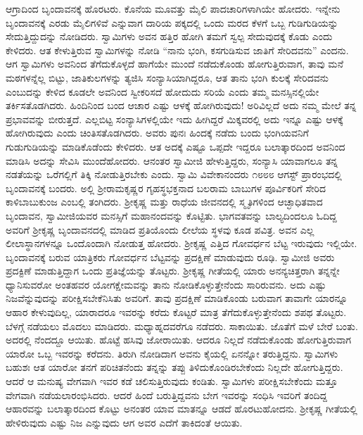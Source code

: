  ಆಗ್ರಾದಿಂದ ಬೃಂದಾವನಕ್ಕೆ ಹೊರಟರು. ಕೊನೆಯ ಮೂವತ್ತು ಮೈಲಿ ಪಾದಚಾರಿಗಳಾಗಿಯೇ ಹೋದರು. ಇನ್ನೇನು ಬೃಂದಾವನಕ್ಕೆ ಎರಡು ಮೈಲಿಗಳಿವೆ ಎನ್ನುವಾಗ ದಾರಿಯ ಪಕ್ಕದಲ್ಲಿ ಒಂದು ಮರದ ಕೆಳಗೆ ಒಬ್ಬ ಗುಡಿಗುಡಿಯನ್ನು ಸೇದುತ್ತಿದ್ದುದನ್ನು ನೋಡಿದರು. ಸ್ವಾಮಿಗಳು ಅವನ ಹತ್ತಿರ ಹೋಗಿ ತಮಗೆ ಸ್ವಲ್ಪ ಸೇದುವುದಕ್ಕೆ ಕೊಡು ಎಂದು ಕೇಳಿದರು. ಆತ ಕೇಳುತ್ತಿರುವ ಸ್ವಾಮಿಗಳನ್ನು ನೋಡಿ “ನಾನು ಭಂಗಿ, ಕಸಗುಡಿಸುವ ಜಾತಿಗೆ ಸೇರಿದವನು” ಎಂದನು. ಆಗ ಸ್ವಾಮಿಗಳು ಅವನಿಂದ ತೆಗೆದುಕೊಳ್ಳದೆ ಹಾಗೆಯೇ ಮುಂದೆ ನಡೆದುಕೊಂಡು ಹೋಗುತ್ತಿರುವಾಗ, ತಾವು ಮನೆ ಮಠಗಳನ್ನೆಲ್ಲ ಬಿಟ್ಟು, ಜಾತಿಕುಲಗಳನ್ನು ತ್ಯಜಿಸಿ ಸಂನ್ಯಾಸಿಯಾಗಿದ್ದರೂ, ಆತ ತಾನು ಭಂಗಿ ಕುಲಕ್ಕೆ ಸೇರಿದವನು ಎಂಬುದನ್ನು ಕೇಳಿದ ಕೂಡಲೇ ಅವನಿಂದ ಸ್ವೀಕರಿಸದೆ ಹೋದುದು ಸರಿಯೆ ಎಂದು ತಮ್ಮ ಮನಸ್ಸಿನಲ್ಲಿಯೇ ತರ್ಕಿಸತೊಡಗಿದರು. ಹಿಂದಿನಿಂದ ಬಂದ ಆಚಾರ ಎಷ್ಟು ಆಳಕ್ಕೆ ಹೋಗಿರುವುದು! ಅರಿವಿಲ್ಲದೆ ಅದು ನಮ್ಮ ಮೇಲೆ ತನ್ನ ಪ್ರಭಾವವನ್ನು ಬೀರುತ್ತದೆ. ಎಲ್ಲಬಿಟ್ಟ ಸಂನ್ಯಾಸಿಗಳಲ್ಲಿಯೇ ಇದು ಹೀಗಿದ್ದರೆ ಮಿಕ್ಕವರಲ್ಲಿ ಅದು ಇನ್ನೂ ಎಷ್ಟು ಆಳಕ್ಕೆ ಹೋಗಿರುವುದು ಎಂದು ಚಿಂತಿಸತೊಡಗಿದರು. ಅವರು ಪುನಃ ಹಿಂದಕ್ಕೆ ನಡೆದು ಬಂದು ಭಂಗಿಯವನಿಗೆ ಗುಡುಗುಡಿಯನ್ನು ಮಾಡಿಕೊಡೆಂದು ಕೇಳಿದರು. ಆತ ಅದಕ್ಕೆ ಎಷ್ಟೂ ಒಪ್ಪದೇ ಇದ್ದರೂ ಬಲಾತ್ಕಾರದಿಂದ ಅವನಿಂದ ಮಾಡಿಸಿ ಅದನ್ನು ಸೇವಿಸಿ ಮುಂದೆಹೋದರು. ಆನಂತರ ಸ್ವಾಮೀಜಿ ಹೇಳುತ್ತಿದ್ದರು, ಸಂನ್ಯಾಸಿ ಯಾವಾಗಲೂ ತನ್ನ ನಡತೆಯನ್ನು ಒರೆಗಲ್ಲಿಗೆ ತಿಕ್ಕಿ ನೋಡುತ್ತಿರಬೇಕು ಎಂದು. ಸ್ವಾಮಿ ವಿವೇಕಾನಂದರು ೧೮೮೮ ಆಗಸ್ಟ್ ಪ್ರಾರಂಭದಲ್ಲಿ ಬೃಂದಾವನಕ್ಕೆ ಬಂದರು. ಅಲ್ಲಿ ಶ‍್ರೀರಾಮಕೃಷ್ಣರ ಗೃಹಸ್ಥಭಕ್ತನಾದ ಬಲರಾಮ ಬಾಬುಗಳ ಪೂರ್ವಿಕರಿಗೆ ಸೇರಿದ ಕಾಳಿಬಾಬುಕುಂಜ ಎಂಬಲ್ಲಿ ತಂಗಿದರು. ಶ‍್ರೀಕೃಷ್ಣ ಮತ್ತು ರಾಧೆಯ ಜೀವನದಲ್ಲಿ ಸ್ಮೃತಿಗಳಿಂದ ಆಚ್ಛಾಧಿತವಾದ ಬೃಂದಾವನ, ಸ್ವಾಮೀಜಿಯವರ ಮನಸ್ಸಿಗೆ ಮಹಾನಂದವನ್ನು ಕೊಟ್ಟಿತು. ಭಾಗವತವನ್ನು ಬಾಲ್ಯದಿಂದಲೂ ಓದಿದ್ದ ಅವರಿಗೆ ಶ‍್ರೀಕೃಷ್ಣ ಬೃಂದಾವನದಲ್ಲಿ ಮಾಡಿದ ಪ್ರತಿಯೊಂದು ಲೀಲೆಯ ಸ್ಥಳವು ಕೂಡ ಪವಿತ್ರ. ಅವನ ಎಲ್ಲ ಲೀಲಾಸ್ಥಾನಗಳನ್ನೂ ಒಂದೊಂದಾಗಿ ನೋಡುತ್ತ ಹೋದರು. ಶ‍್ರೀಕೃಷ್ಣ ಎತ್ತಿದ ಗೋವರ್ಧನ ಬೆಟ್ಟ ಇರುವುದು ಇಲ್ಲಿಯೇ. ಬೃಂದಾವನಕ್ಕೆ ಬರುವ ಯಾತ್ರಿಕರು ಗೋವರ್ಧನ ಬೆಟ್ಟವನ್ನು ಪ್ರದಕ್ಷಿಣೆ ಮಾಡುವುದು ರೂಢಿ. ಸ್ವಾಮೀಜಿ ಅವರು ಪ್ರದಕ್ಟಿಣೆ ಮಾಡುತ್ತಿದ್ದಾಗ ಒಂದು ಪ್ರತಿಜ್ಞೆಯನ್ನು ತೊಟ್ಟರು. ಶ‍್ರೀಕೃಷ್ಣ ಗೀತೆಯಲ್ಲಿ ಯಾರು ಅನನ್ಯಚಿತ್ತರಾಗಿ ತನ್ನನ್ನೇ ಧ್ಯಾನಿಸುವರೋ ಅಂತಹವರ ಯೋಗಕ್ಷೇಮವನ್ನು ತಾನು ನೋಡಿಕೊಳ್ಳುತ್ತೇನೆಂದು ಸಾರಿರುವನು. ಅದು ಎಷ್ಟು ನಿಜವೆನ್ನುವುದನ್ನು ಪರೀಕ್ಷಿಸಬೇಕೆನಿಸಿತು ಅವರಿಗೆ. ತಾವು ಪ್ರದಕ್ಷಿಣೆ ಮಾಡಿಕೊಂಡು ಬರುವಾಗ ತಾವಾಗೇ ಯಾರನ್ನೂ ಆಹಾರ ಕೇಳುವುದಿಲ್ಲ, ಯಾರಾದರೂ ಇವರನ್ನು ಕರೆದು ಕೊಟ್ಟರೆ ಮಾತ್ರ ತೆಗೆದುಕೊಳ್ಳುತ್ತೇನೆಂದು ಶಪಥ ತೊಟ್ಟರು. ಬೆಳಗ್ಗೆ ನಡೆಯಲು ಮೊದಲು ಮಾಡಿದರು. ಮಧ್ಯಾಹ್ನದವರೆಗೂ ನಡೆದರು. ಸಾಕಾಯಿತು. ಜೊತೆಗೆ ಮಳೆ ಬೇರೆ ಬಂತು. ಅದರಲ್ಲಿ ನೆಂದದ್ದೂ ಆಯಿತು. ಹೊಟ್ಟೆ ಹಸಿವು ಜೋರಾಯಿತು. ಆದರೂ ನಿಲ್ಲದೆ ನಡೆದುಕೊಂಡು ಹೋಗುತ್ತಿರುವಾಗ ಯಾರೋ ಒಬ್ಬ ಇವರನ್ನು ಕರೆದನು. ತಿರುಗಿ ನೋಡಿದಾಗ ಅವನು ಕೈಯಲ್ಲಿ ಏನನ್ನೋ ತರುತ್ತಿದ್ದನು. ಸ್ವಾಮಿಗಳು ಬಹುಶಃ ಆತ ಯಾರೋ ತನಗೆ ಪರಿಚಿತನೆಂದು ತನ್ನನ್ನು ತಪ್ಪು ತಿಳಿದುಕೊಂಡಿರಬೇಕೆಂದು ನಿಲ್ಲದೇ ಹೋಗುತ್ತಿದ್ದರು. ಆದರೆ ಆ ಮನುಷ್ಯ ವೇಗವಾಗಿ ಇವರ ಕಡೆ ಚಲಿಸುತ್ತಿರುವುದು ಕಂಡಿತು. ಸ್ವಾಮಿಗಳು ಪರೀಕ್ಷಿಸಬೇಕೆಂದು ಮತ್ತೂ ವೇಗವಾಗಿ ನಡೆಯಲಾರಂಭಿಸಿದರು. ಆದರೆ ಹಿಂದೆ ಬರುತ್ತಿದ್ದವನು ಬೇಗ ಇವರನ್ನು ಸಂಧಿಸಿ ಇವರಿಗೆ ತಂದಿದ್ದ ಆಹಾರವನ್ನು ಬಲಾತ್ಕಾರದಿಂದ ಕೊಟ್ಟು ಅನಂತರ ಯಾವ ಮಾತನ್ನೂ ಆಡದೆ ಹೊರಟುಹೋದನು. ಶ‍್ರೀಕೃಷ್ಣ ಗೀತೆಯಲ್ಲಿ ಹೇಳಿರುವುದು ಎಷ್ಟು ನಿಜ ಎನ್ನುವುದು ಆಗ ಅವರ ಎದೆಗೆ ತಾಕಿದಂತೆ ಆಯಿತು. 

